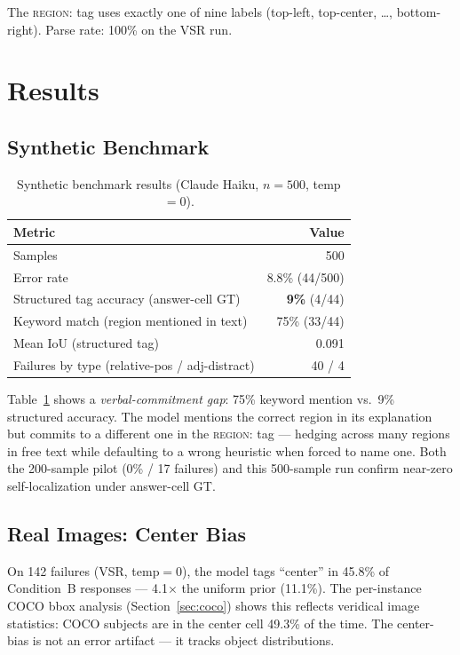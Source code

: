 \documentclass[11pt]{article}
\begin{document}
\noindent The \textsc{region:} tag uses exactly one of nine labels
(top-left, top-center, \ldots, bottom-right).
Parse rate: 100\% on the VSR run.


\section{Results}

\subsection{Synthetic Benchmark}
\label{sec:synthetic}

\begin{table}[t]
\centering
\small
\begin{tabular}{lr}
\toprule
Metric & Value \\
\midrule
Samples & 500 \\
Error rate & 8.8\% (44/500) \\
Structured tag accuracy (answer-cell GT) & \textbf{9\%} (4/44) \\
Keyword match (region mentioned in text) & 75\% (33/44) \\
Mean IoU (structured tag) & 0.091 \\
Failures by type (relative-pos / adj-distract) & 40 / 4 \\
\bottomrule
\end{tabular}
\caption{Synthetic benchmark results (Claude Haiku, $n{=}500$, temp$=0$).}
\label{tab:synthetic}
\end{table}

Table~\ref{tab:synthetic} shows a \emph{verbal-commitment gap}: 75\% keyword
mention vs.\ 9\% structured accuracy.
The model mentions the correct region in its explanation but commits to a different
one in the \textsc{region:} tag — hedging across many regions in free text while
defaulting to a wrong heuristic when forced to name one.
Both the 200-sample pilot (0\% / 17 failures) and this 500-sample run confirm
near-zero self-localization under answer-cell GT.

\subsection{Real Images: Center Bias}
\label{sec:center}

On 142 failures (VSR, temp$=0$), the model tags ``center'' in 45.8\% of
Condition~B responses — 4.1$\times$ the uniform prior (11.1\%).
The per-instance COCO bbox analysis (Section~\ref{sec:coco}) shows this reflects
veridical image statistics: COCO subjects are in the center cell 49.3\% of the time.
The center-bias is not an error artifact — it tracks object distributions.
\end{document}
